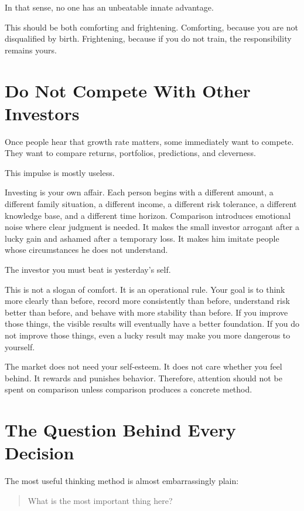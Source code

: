 In that sense, no one has an unbeatable innate advantage.

This should be both comforting and frightening. Comforting, because you are not disqualified by birth. Frightening, because if you do not train, the responsibility remains yours.

\section*{Do Not Compete With Other Investors}

Once people hear that growth rate matters, some immediately want to compete. They want to compare returns, portfolios, predictions, and cleverness.

This impulse is mostly useless.

Investing is your own affair. Each person begins with a different amount, a different family situation, a different income, a different risk tolerance, a different knowledge base, and a different time horizon. Comparison introduces emotional noise where clear judgment is needed. It makes the small investor arrogant after a lucky gain and ashamed after a temporary loss. It makes him imitate people whose circumstances he does not understand.

The investor you must beat is yesterday's self.

This is not a slogan of comfort. It is an operational rule. Your goal is to think more clearly than before, record more consistently than before, understand risk better than before, and behave with more stability than before. If you improve those things, the visible results will eventually have a better foundation. If you do not improve those things, even a lucky result may make you more dangerous to yourself.

The market does not need your self-esteem. It does not care whether you feel behind. It rewards and punishes behavior. Therefore, attention should not be spent on comparison unless comparison produces a concrete method.

\section*{The Question Behind Every Decision}

The most useful thinking method is almost embarrassingly plain:

\begin{quote}
What is the most important thing here?
\end{quote}

